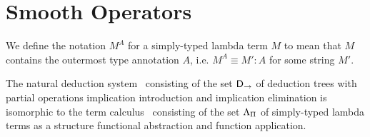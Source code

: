 \section{Smooth Operators}

\begin{definition}
We define the notation $M^{A}$ for a simply-typed lambda term $M$ to mean that
$M$ contains the outermost type annotation $A$, i.e. $M^A \equiv M':A$ for some
string $M'$.
\end{definition}

\begin{theorem}

The natural deduction system \implnpi\ consisting of the set $\mathsf{D}_\to$ of
deduction trees with partial operations implication introduction and implication
elimination is isomorphic to the term calculus \stlambda\ consisting of the set
$\Lambda_\Pi$ of simply-typed lambda terms as a structure functional
abstraction and function application.

\end{theorem}

